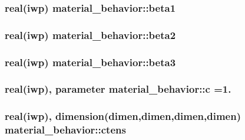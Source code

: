 \subsubsection[{beta1}]{\setlength{\rightskip}{0pt plus 5cm}real(iwp) material\+\_\+behavior\+::beta1}\label{classmaterial__behavior_a99816d6be4ed7244881e685956b7ac06}
\hypertarget{classmaterial__behavior_a91b0b1309a8dfde964d4e497a0d1dcfe}{}
\subsubsection[{beta2}]{\setlength{\rightskip}{0pt plus 5cm}real(iwp) material\+\_\+behavior\+::beta2}\label{classmaterial__behavior_a91b0b1309a8dfde964d4e497a0d1dcfe}
\hypertarget{classmaterial__behavior_a5c660e2829ac287aeb8d6dd0614da6c1}{}
\subsubsection[{beta3}]{\setlength{\rightskip}{0pt plus 5cm}real(iwp) material\+\_\+behavior\+::beta3}\label{classmaterial__behavior_a5c660e2829ac287aeb8d6dd0614da6c1}
\hypertarget{classmaterial__behavior_a3d67223e37edfba954fbb0e15fd534f0}{}
\subsubsection[{c}]{\setlength{\rightskip}{0pt plus 5cm}real(iwp), parameter material\+\_\+behavior\+::c =1.}\label{classmaterial__behavior_a3d67223e37edfba954fbb0e15fd534f0}
\hypertarget{classmaterial__behavior_a2d91ec36eec7e8c7c5f24cca84e5a214}{}
\subsubsection[{ctens}]{\setlength{\rightskip}{0pt plus 5cm}real(iwp), dimension(dimen,dimen,dimen,dimen) material\+\_\+behavior\+::ctens}\label{classmaterial__behavior_a2d91ec36eec7e8c7c5f24cca84e5a214}
\hypertarget{classmaterial__behavior_abd37805114cdc4a1f45c3b92bdda99cd}{}
